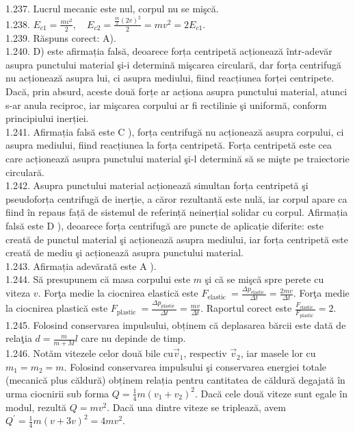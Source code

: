 \documentclass[10pt]{article}
\begin{document}
1.237. Lucrul mecanic este nul, corpul nu se mişcă.\\
1.238. $E_{c 1}=\frac{m v^{2}}{2}, \quad E_{c 2}=\frac{\frac{m}{2}(2 v)^{2}}{2}=m v^{2}=2 E_{c 1}$.\\
1.239. Răspuns corect: A).\\
1.240. D) este afirmația falsă, deoarece forța centripetă acționează într-adevăr asupra punctului material şi-i determină mişcarea circulară, dar forța centrifugă nu acționează asupra lui, ci asupra mediului, fiind reacțiunea forței centripete. Dacă, prin absurd, aceste două forțe ar acționa asupra punctului material, atunci s-ar anula reciproc, iar mişcarea corpului ar fi rectilinie şi uniformă, conform principiului inerției.\\
1.241. Afirmația falsă este C ), forța centrifugă nu acționează asupra corpului, ci asupra mediului, fiind reacțiunea la forța centripetă. Forța centripetă este cea care acționează asupra punctului material şi-l determină să se mişte pe traiectorie circulară.\\
1.242. Asupra punctului material acționează simultan forța centripetă şi pseudoforța centrifugă de inerție, a căror rezultantă este nulă, iar corpul apare ca fiind în repaus față de sistemul de referință neinerțial solidar cu corpul. Afirmația falsă este D ), deoarece forța centrifugă are puncte de aplicație diferite: este creată de punctul material şi acționează asupra mediului, iar forța centripetă este creată de mediu şi acționează asupra punctului material.\\
1.243. Afirmația adevărată este A ).\\
1.244. Să presupunem că masa corpului este $m$ şi că se mişcă spre perete cu viteza $v$. Forţa medie la ciocnirea elastică este $F_{\text {elastic }}=\frac{\Delta p_{\text {elastic }}}{\Delta t}=\frac{2 m v}{\Delta t}$. Forţa medie la ciocnirea plastică este $F_{\text {plastic }}=\frac{\Delta p_{\text {plastic }}}{\Delta t}=\frac{m v}{\Delta t}$. Raportul corect este $\frac{F_{\text {elastic }}}{F_{\text {plastic }}}=2$.\\
1.245. Folosind conservarea impulsului, obținem că deplasarea bărcii este dată de relaţia $d=\frac{m}{m+M} l$ care nu depinde de timp.\\
1.246. Notăm vitezele celor două bile $\mathrm{cu} \vec{v}_{1}$, respectiv $\vec{v}_{2}$, iar masele lor cu $m_{1}=m_{2}=m$. Folosind conservarea impulsului şi conservarea energiei totale (mecanică plus căldură) obținem relația pentru cantitatea de căldură degajată în urma ciocnirii sub forma $Q=\frac{1}{4} m\left(v_{1}+v_{2}\right)^{2}$. Dacă cele două viteze sunt egale în modul, rezultă $Q=m v^{2}$. Dacă una dintre viteze se triplează, avem $Q^{\prime}=\frac{1}{4} m(v+3 v)^{2}=4 m v^{2}$.\\
\end{document}
